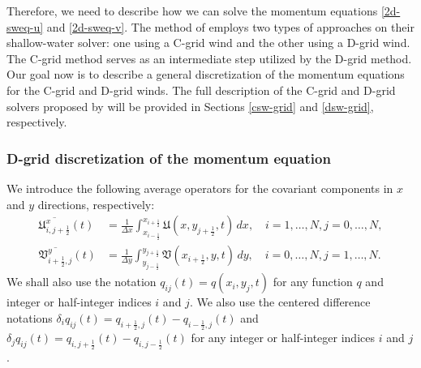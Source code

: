 Therefore, we need to describe how we can solve the momentum equations \eqref{2d-sweq-u} and \eqref{2d-sweq-v}. 
The method of \citet{lin:1997} employs two types of approaches on their shallow-water solver: one using a C-grid wind and the other using a D-grid wind.
The C-grid method serves as an intermediate step utilized by the D-grid method.
Our goal now is to describe a general discretization of the momentum equations for the C-grid and D-grid winds.
The full description of the C-grid and D-grid solvers proposed by 
\citet{lin:1997} will be provided in Sections \ref{csw-grid} and \ref{dsw-grid}, respectively.

\subsubsection{D-grid discretization of the momentum equation }
We introduce the following average operators for the covariant components in $x$ and $y$ directions, respectively:
\begin{align}
	\label{2d-sweq-int_u}
	\overline{\mathfrak{U}^x_{i,j+\frac{1}{2}}}(t)&= \frac{1}{\Delta x} \int_{x_{i-\frac{1}{2}}}^{x_{i+\frac{1}{2}}} \mathfrak{U}(x, y_{j+\frac{1}{2}}, t) \,dx , \quad i=1,\ldots,N,j=0,\ldots, N,\\
	\label{2d-sweq-int_v}
	\overline{\mathfrak{V}^y_{i+\frac{1}{2},j}}(t)&= \frac{1}{\Delta y} \int_{y_{j-\frac{1}{2}}}^{y_{j+\frac{1}{2}}} \mathfrak{V}(x_{i+\frac{1}{2}}, y, t) \,dy,  \quad i=0,\ldots,N,j=1,\ldots, N.
\end{align}
We shall also use the notation $q_{ij}(t) = q(x_i,y_j,t)$ for any function $q$ and integer or half-integer indices $i$ and $j$.
We also use the centered difference notations $\delta _i q_{ij}(t) =q_{i+\frac{1}{2},j}(t) -q_{i-\frac{1}{2},j}(t)$ and 
$\delta _j q_{ij}(t) = q_{i,j+\frac{1}{2}}(t) -q_{i,j-\frac{1}{2}}(t)$ for any integer or half-integer indices $i$ and $j$.


